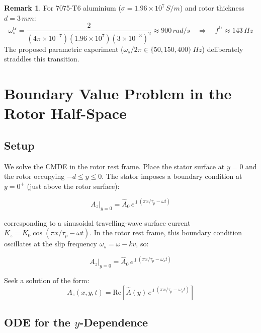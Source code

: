 \documentclass[12pt, a4paper]{article}
\theoremstyle{plain}
\theoremstyle{definition}
\newtheorem{remark}[theorem]{Remark}
\newcommand{\taup}{\tau_p}
\newcommand{\oms}{\omega_s}
\newcommand{\sig}{\sigma}
\begin{document}
\begin{remark}
  For 7075-T6 aluminium ($\sig = 1.96\times10^7\,\si{S/m}$) and rotor thickness
  $d = 3\,\si{mm}$:
  \[
    \oms^{\mathrm{tr}}
    = \frac{2}{(4\pi\times10^{-7})(1.96\times10^7)(3\times10^{-3})^2}
    \approx 900\,\si{rad/s}
    \quad \Longrightarrow \quad
    f^{\mathrm{tr}} \approx 143\,\si{Hz}
  \]
  The proposed parametric experiment ($\oms/2\pi \in \{50, 150, 400\}\,\si{Hz}$)
  deliberately straddles this transition.
\end{remark}


\section{Boundary Value Problem in the Rotor Half-Space}
\label{sec:bvp}

\subsection{Setup}

We solve the CMDE in the rotor rest frame. Place the stator surface at $y=0$
and the rotor occupying $-d \leq y \leq 0$. The stator imposes a boundary
condition at $y = 0^+$ (just above the rotor surface):

\begin{equation}
  A_z\big|_{y=0} = \hat{A}_0\, e^{\jmath(\pi x/\taup - \omega t)}
  \label{eq:bc_stator}
\end{equation}

corresponding to a sinusoidal travelling-wave surface current
$K_z = K_0\cos(\pi x/\taup - \omega t)$. In the rotor rest frame, this boundary
condition oscillates at the slip frequency $\oms = \omega - kv$, so:

\begin{equation}
  A_z\big|_{y=0} = \hat{A}_0\, e^{\jmath(\pi x/\taup - \oms t)}
\end{equation}

Seek a solution of the form:
\begin{equation}
  A_z(x,y,t) = \mathrm{Re}\left[\hat{A}(y)\,e^{\jmath(\pi x/\taup - \oms t)}\right]
  \label{eq:ansatz}
\end{equation}

\subsection{ODE for the $y$-Dependence}
\end{document}
